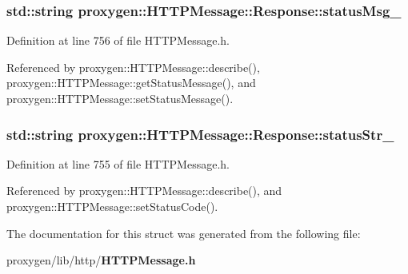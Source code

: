 \subsubsection[{status\+Msg\+\_\+}]{\setlength{\rightskip}{0pt plus 5cm}std\+::string proxygen\+::\+H\+T\+T\+P\+Message\+::\+Response\+::status\+Msg\+\_\+}\label{structproxygen_1_1HTTPMessage_1_1Response_a8ac7a606164c5e04a7063454880fd26a}


Definition at line 756 of file H\+T\+T\+P\+Message.\+h.



Referenced by proxygen\+::\+H\+T\+T\+P\+Message\+::describe(), proxygen\+::\+H\+T\+T\+P\+Message\+::get\+Status\+Message(), and proxygen\+::\+H\+T\+T\+P\+Message\+::set\+Status\+Message().

\subsubsection[{status\+Str\+\_\+}]{\setlength{\rightskip}{0pt plus 5cm}std\+::string proxygen\+::\+H\+T\+T\+P\+Message\+::\+Response\+::status\+Str\+\_\+}\label{structproxygen_1_1HTTPMessage_1_1Response_a0e0f49af6e079c58966a7992a496859a}


Definition at line 755 of file H\+T\+T\+P\+Message.\+h.



Referenced by proxygen\+::\+H\+T\+T\+P\+Message\+::describe(), and proxygen\+::\+H\+T\+T\+P\+Message\+::set\+Status\+Code().



The documentation for this struct was generated from the following file\+:\begin{DoxyCompactItemize}
\item 
proxygen/lib/http/{\bf H\+T\+T\+P\+Message.\+h}\end{DoxyCompactItemize}
